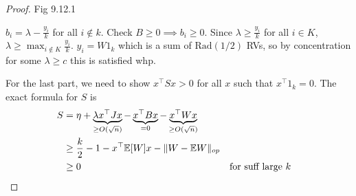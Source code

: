 \begin{proof}
    Fig 9.12.1
    
    $b_i = \lambda - \frac{y_i}{k}$ for all $i \not\in k$.
    Check $B \geq 0 \implies b_i \geq 0$. Since $\lambda \geq \frac{y_i}{k}$ for all
    $i \in K$, $\lambda \geq \max_{i \not\in K} \frac{y_i}{k}$.
    $y_i = W 1_k$ which is a sum of $\text{Rad}(1/2)$ RVs, so 
    by concentration for some $\lambda \geq c$ this is satisfied whp.
    
    For the last part, we need to show $x^\top S x > 0$ for all $x$ such that
    $x^\top 1_k = 0$. The exact formula for $S$ is 
    \begin{align}
        S 
        &= \eta + \underbrace{\lambda x^\top J x}_{\geq O(\sqrt{n})} - \underbrace{x^\top B x}_{=0} - \underbrace{x^\top W x}_{\geq O(\sqrt{n})} \\
        &\geq \frac{k}{2} - 1 - x^\top \mathbb{E}[W] x - \|W - \mathbb{E} W\|_{op} \\
        &\geq 0 &&\text{for suff large $k$}
    \end{align}
\end{proof}